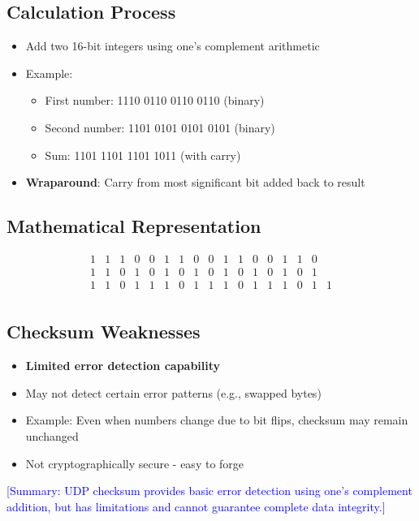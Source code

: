 \documentclass[12pt]{article}
\begin{document}
\subsection{Calculation Process}
\begin{itemize}
    \item Add two 16-bit integers using one's complement arithmetic
    \item Example:
          \begin{itemize}
              \item First number: 1110 0110 0110 0110 (binary)
              \item Second number: 1101 0101 0101 0101 (binary)
              \item Sum: 1101 1101 1101 1011 (with carry)
          \end{itemize}
    \item \textbf{Wraparound}: Carry from most significant bit added back to result
\end{itemize}

\subsection{Mathematical Representation}
\[
    \begin{array}{cccccccccccccccc}
        1 & 1 & 1 & 0 & 0 & 1 & 1 & 0 & 0 & 1 & 1 & 0 & 0 & 1 & 1 & 0     \\
        1 & 1 & 0 & 1 & 0 & 1 & 0 & 1 & 0 & 1 & 0 & 1 & 0 & 1 & 0 & 1     \\
        \hline
        1 & 1 & 0 & 1 & 1 & 1 & 0 & 1 & 1 & 1 & 0 & 1 & 1 & 1 & 0 & 1 & 1 \\
    \end{array}
\]

\subsection{Checksum Weaknesses}
\begin{itemize}
    \item \textbf{Limited error detection capability}
    \item May not detect certain error patterns (e.g., swapped bytes)
    \item Example: Even when numbers change due to bit flips, checksum may remain unchanged
    \item Not cryptographically secure - easy to forge
\end{itemize}

\textcolor{blue}{[Summary: UDP checksum provides basic error detection using one's complement addition, but has limitations and cannot guarantee complete data integrity.]}
\end{document}
